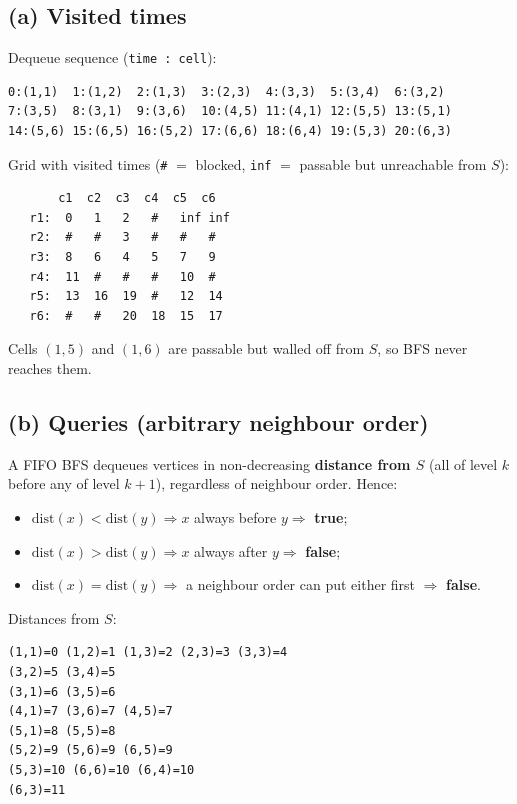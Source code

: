 \documentclass[11pt]{article}
\begin{document}
\subsection*{(a) Visited times}

Dequeue sequence (\texttt{time : cell}):
\begin{verbatim}
0:(1,1)  1:(1,2)  2:(1,3)  3:(2,3)  4:(3,3)  5:(3,4)  6:(3,2)
7:(3,5)  8:(3,1)  9:(3,6)  10:(4,5) 11:(4,1) 12:(5,5) 13:(5,1)
14:(5,6) 15:(6,5) 16:(5,2) 17:(6,6) 18:(6,4) 19:(5,3) 20:(6,3)
\end{verbatim}

Grid with visited times (\texttt{\#} $=$ blocked, \texttt{inf} $=$ passable but
unreachable from $S$):
\begin{verbatim}
       c1  c2  c3  c4  c5  c6
   r1:  0   1   2   #   inf inf
   r2:  #   #   3   #   #   #
   r3:  8   6   4   5   7   9
   r4:  11  #   #   #   10  #
   r5:  13  16  19  #   12  14
   r6:  #   #   20  18  15  17
\end{verbatim}

Cells $(1,5)$ and $(1,6)$ are passable but walled off from $S$, so BFS never reaches
them.

\subsection*{(b) Queries (arbitrary neighbour order)}

A FIFO BFS dequeues vertices in non-decreasing \textbf{distance from $S$} (all of
level $k$ before any of level $k+1$), regardless of neighbour order. Hence:
\begin{itemize}[nosep]
  \item $\mathrm{dist}(x)<\mathrm{dist}(y)\Rightarrow x$ always before $y\Rightarrow$ \textbf{true};
  \item $\mathrm{dist}(x)>\mathrm{dist}(y)\Rightarrow x$ always after $y\Rightarrow$ \textbf{false};
  \item $\mathrm{dist}(x)=\mathrm{dist}(y)\Rightarrow$ a neighbour order can put either first $\Rightarrow$ \textbf{false}.
\end{itemize}

Distances from $S$:
\begin{verbatim}
(1,1)=0 (1,2)=1 (1,3)=2 (2,3)=3 (3,3)=4
(3,2)=5 (3,4)=5
(3,1)=6 (3,5)=6
(4,1)=7 (3,6)=7 (4,5)=7
(5,1)=8 (5,5)=8
(5,2)=9 (5,6)=9 (6,5)=9
(5,3)=10 (6,6)=10 (6,4)=10
(6,3)=11
\end{verbatim}
\end{document}
